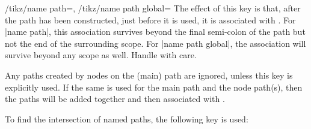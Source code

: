 \begin{keylist}{%
	/tikz/name path=,
	/tikz/name path global=}
  The effect of this key is that, after the path has been constructed,
  just before it is used, it is associated with . For |name path|,
  this association survives beyond the final semi-colon of the path
  but not the end of the surrounding scope. For |name path global|, the association
  will survive beyond any scope as well. Handle with care.

  Any paths created by nodes on the (main) path are ignored, unless
  this key is explicitly used. If the same  is used for the
  main path and the node path(s), then the paths will be added
  together and then associated with .
\end{keylist}

To find the intersection of named paths, the following key is used:

